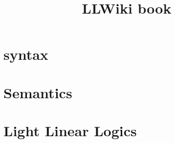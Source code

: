 \documentclass[a4paper,11pt]{book}
\title{LLWiki book}
\begin{document}
\maketitle

\tableofcontents

\newpage

\part{syntax}


\newpage


\newpage

\newpage

\newpage


\newpage

\newpage


\newpage


\newpage







\newpage




\part{Semantics}








\newpage




\newpage


\part{Light Linear Logics}


\end{document}
